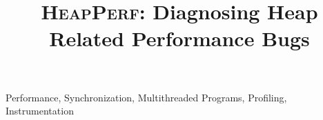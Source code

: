 \documentclass[preprint,10pt]{sigplanconf}
\newcommand{\HeapPerf}{{\scshape HeapPerf}}
\begin{document}
\setlength{\pdfpageheight}{\paperheight}
\setlength{\pdfpagewidth}{\paperwidth}


\title{{\huge \bf \HeapPerf{}}: Diagnosing Heap Related Performance Bugs}%






\maketitle

\begin{abstract}

\end{abstract}


\keywords
Performance, Synchronization, Multithreaded Programs, Profiling, Instrumentation



\end{document}
